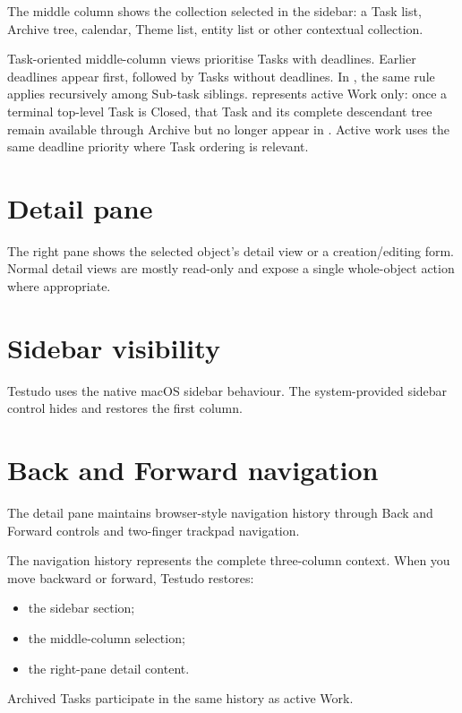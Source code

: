 \documentclass{testudomanual}
\begin{document}
The middle column shows the collection selected in the sidebar: a Task list, Archive tree, calendar, Theme list, entity list or other contextual collection.

Task-oriented middle-column views prioritise Tasks with deadlines. Earlier deadlines appear first, followed by Tasks without deadlines. In , the same rule applies recursively among Sub-task siblings.  represents active Work only: once a terminal top-level Task is Closed, that Task and its complete descendant tree remain available through Archive but no longer appear in . Active  work uses the same deadline priority where Task ordering is relevant.

\section{Detail pane}

The right pane shows the selected object's detail view or a creation/editing form. Normal detail views are mostly read-only and expose a single whole-object  action where appropriate.

\section{Sidebar visibility}

Testudo uses the native macOS sidebar behaviour. The system-provided sidebar control hides and restores the first column.

\section{Back and Forward navigation}

The detail pane maintains browser-style navigation history through Back and Forward controls and two-finger trackpad navigation.

The navigation history represents the complete three-column context. When you move backward or forward, Testudo restores:
\begin{itemize}
    \item the sidebar section;
    \item the middle-column selection;
    \item the right-pane detail content.
\end{itemize}

Archived Tasks participate in the same history as active Work.
\end{document}
